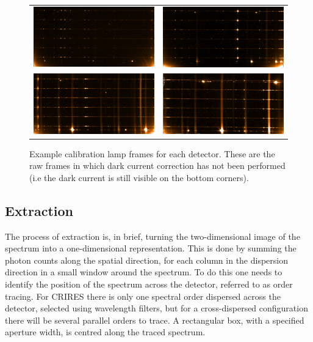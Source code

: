 \begin{figure}
    \begin{tabular}{cc}
         \includegraphics[width=.45\hsize]{./figures/reduction/Thar_1.png} & \includegraphics[width=.45\hsize]{./figures/reduction/Thar_2.png} \\
         \includegraphics[width=.45\hsize]{./figures/reduction/Thar_3.png} & \includegraphics[width=.45\hsize]{./figures/reduction/Thar_4.png} \\
    \end{tabular}

    \caption[Example \thar{} calibration lamp frames for each detector.]{Example \thar{} calibration lamp frames for each detector.
        These are the raw frames in which dark current correction has not been performed (i.e the dark current is still visible on the bottom corners).}
    \label{fig:caliblamps}
\end{figure}


\subsection{Extraction}
\label{subsec:extraction}
The process of extraction is, in brief, turning the two-dimensional image of the spectrum into a one-dimensional representation.
This is done by summing the photon counts along the spatial direction, for each column in the dispersion direction in a small window around the spectrum.
To do this one needs to identify the position of the spectrum across the detector, referred to as {order tracing}.
For {CRIRES} there is only one spectral order dispersed across the detector, selected using wavelength filters, but for a cross-dispersed configuration there will be several parallel orders to trace.
A rectangular box, with a specified aperture width, is centred along the traced spectrum.

